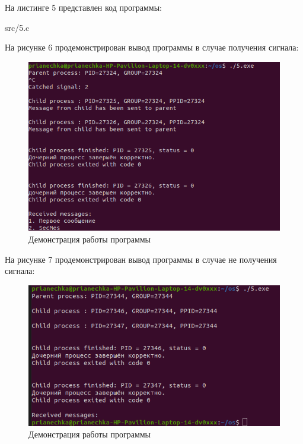 На листинге 5 представлен код программы:

\FloatBarrier
\begin{lstinputlisting}[language=C++, caption=Код задания 5, 
	linerange={1-92}, showstringspaces=false, basicstyle=\footnotesize\ttfamily, frame=single,breaklines=true]{src/5.c}
\end{lstinputlisting}
\FloatBarrier

На рисунке 6 продемонстрирован вывод программы в случае получения сигнала:

\FloatBarrier
\begin{figure}[h]
	\begin{center}
		\includegraphics[]{inc/five_yes.png}
	\end{center}
	\caption{Демонстрация работы программы}
\end{figure}
\FloatBarrier

На рисунке 7 продемонстрирован вывод программы в случае не получения сигнала:

\FloatBarrier
\begin{figure}[h]
	\begin{center}
		\includegraphics[]{inc/five_no.png}
	\end{center}
	\caption{Демонстрация работы программы}
\end{figure}
\FloatBarrier

